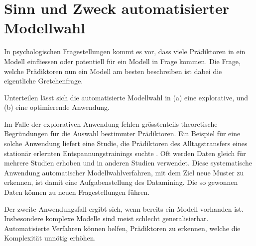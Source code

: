 \section{Sinn und Zweck automatisierter Modellwahl}
In psychologischen Fragestellungen kommt es vor, dass viele Prädiktoren in ein Modell einfliessen oder potentiell für ein Modell in Frage kommen.
Die Frage, welche Prädiktoren nun ein Modell am besten beschreiben ist dabei die eigentliche Gretchenfrage. 

Unterteilen lässt sich die automatisierte Modellwahl in (a) eine explorative, und (b) eine optimierende Anwendung. 

Im Falle der explorativen Anwendung fehlen grösstenteils theoretische Begründungen für die Auswahl bestimmter Prädiktoren. Ein Beispiel für eine solche Anwendung liefert eine Studie, die Prädiktoren des Alltagstransfers eines stationär erlernten Entspannungstrainings suchte \cite{023755520080101}.
Oft werden Daten gleich für mehrere Studien erhoben und in anderen Studien verwendet.
Diese systematische Anwendung automatischer Modellwahlverfahren, mit dem Ziel neue Muster zu erkennen, ist damit eine Aufgabenstellung des Datamining. 
Die so gewonnen Daten können zu neuen Fragestellungen führen. 

Der zweite Anwendungsfall ergibt sich, wenn bereits ein Modell vorhanden ist. Insbesondere komplexe Modelle sind meist schlecht generalisierbar. Automatisierte Verfahren können  helfen, Prädiktoren zu erkennen, welche die Komplexität unnötig erhöhen.